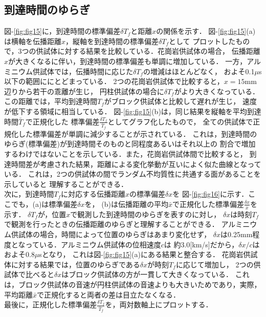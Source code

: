 \subsection{到達時間のゆらぎ}
図-\ref{fig:fig15}に，到達時間の標準偏差$\delta T_f$と距離$x$の関係を示す．
図-\ref{fig:fig15}(a)は横軸を伝播距離$x$，縦軸を到達時間の標準偏差$\delta T_f$として
プロットしたもので，3つの供試体に対する結果を比較している．花崗岩供試体の場合，
伝播距離$x$が大きくなるに伴い，到達時間の標準偏差も単調に増加している．
一方，アルミニウム供試体では，伝播時間に応じた$\delta T_f$の増減はほとんどなく，
およそ0.1$\mu$s以下の範囲ににとどまっている．
2つの花崗岩供試体で比較すると，$x=15$mm辺りから若干の乖離が生じ，
円柱供試体の場合に$\delta T_f$がより大きくなっている．
この距離では，平均到達時間$T_f$がブロック供試体と比較して遅れが生じ，
速度が低下する領域に相当している．
図-\ref{fig:fig15}(b)は，同じ結果を縦軸を平均到達時間$\bar T_f$で正規化した
標準偏差$\frac{\delta T_f}{\bar{T}_f}$としてグラフ化したもので，
全ての供試体で正規化した標準偏差が単調に減少することが示されている．
これは，到達時間のゆらぎ(標準偏差)が到達時間そのものと同程度あるいはそれ以上の
割合で増加するわけではないことを示している．また，花崗岩供試体間で比較すると，
到達時間差が考慮された結果，距離による変化挙動が互いによく似た曲線となっている．
これは，2つの供試体の間でランダム不均質性に共通する面があることを示していると
理解することができる．\\
\hspace{\parindent}
次に，到達時間$T_f$に対応する伝播距離$x$の標準偏差$\delta x$を
図-\ref{fig:fig16}に示す．ここでも，(a)は標準偏差$\delta x$を，
(b)は伝播距離の平均$\bar{x}$で正規化した標準偏差$\frac{\delta x}{\bar{x}}$を示す．
$\delta T_f$が，位置$x$で観測した到達時間のゆらぎを表すのに対し，
$\delta x$は時刻$T_f$で観測を行ったときの伝播距離のゆらぎと理解することができる．
アルミニウム供試体の場合，時間によって位置のゆらぎはあまり変化せず，
$\delta x$は0.25mm程度となっている．アルミニウム供試体の位相速度$c$は
約3.0[km/s]だから，$\delta x/c$はおよそ$0.8\mu$sとなり，
これは図-\ref{fig:fig15}(a)にある結果と整合する．
花崗岩供試体に対する結果では，位置のゆらぎである$\delta x$が時刻$T_f$に応じて増加し，
2つの供試体で比べると$\delta x$はブロック供試体の方が一貫して大きくなっている．
これは，ブロック供試体の音速が円柱供試体の音速よりも大きいためであり，実際，
平均距離$\bar{x}$で正規化すると両者の差は目立たなくなる．\\
\hspace{\parindent}
最後に，正規化した標準偏差$\frac{\delta T_f}{\bar{T}_f}$を，両対数軸上にプロットする．
